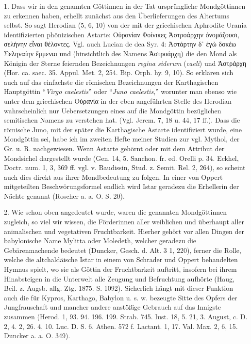 \documentclass[a4paper, 11pt, oneside]{article}
\begin{document}
1. Dass wir in den genannten Göttinnen in der Tat ursprüngliche Mondgöttinnen zu erkennen haben, erhellt zunächst aus den Überlieferungen des Altertums selbst. So sagt Herodian (5, 6, 10) von der mit der griechischen Aphrodite Urania identifizierten phönizischen Astarte: Οὐρανίαν Φοίνικες Ἀστροάρχην ὀνομάζουσι, σελήνην εἶναι θέλοντες. Vgl. auch Lucian de dea Syr. 4: Ἀστάρτην δ᾽ ἐγὼ δοκέω Σεληναίην ἔμμεναι und (hinsichtlich des Namens Ἀστροάρχη) die den Mond als Königin der Sterne feiernden Bezeichnungen \emph{regina siderum} (\emph{caeli}) und Ἀστράρχη (Hor. ca. saec. 35. Appul. Met. 2, 254. Bip. Orph. hy. 9, 10). So erklären sich auch auf das einfachste die römischen Bezeichnungen der Karthagischen Hauptgöttin "`\emph{Virgo caelestis}"' oder "`\emph{Juno caelestis},"' worunter man ebenso wie unter dem griechischen Οὐρανία in der eben angeführten Stelle des Herodian wahrscheinlich nur Uebersetzungen eines auf die Mondgöttin bezüglichen semitischen Namens zu verstehen hat. (Vgl. Jerem. 7, 18 u. 44, 17 ff.). Dass die römische Juno, mit der später die Karthagische Astarte identifiziert wurde, eine Mondgöttin sei, habe ich im zweiten Hefte meiner Studien zur vgl. Mythol, der Gr. u. R. nachgewiesen. Wenn Astarte gehörnt oder mit dem Attribut der Mondsichel dargestellt wurde (Gen. 14, 5. Sanchon. fr. ed. Orelli p. 34. Eckhel, Doctr. num. 1, 3, 369 ff. vgl. v. Baudissin, Stud. z. Semit. Rel. 2, 264), so scheint auch dies direkt aus ihrer Mondbedeutung zu folgen. In einer von Oppert mitgeteilten Beschwörungsformel endlich wird Istar geradezu die Erhellerin der Nächte genannt (Roscher a. a. O. S. 20).

2. Wie schon oben angedeutet wurde, waren die genannten Mondgöttinnen zugleich, so viel wir wissen, die Förderinnen aller weiblichen und überhaupt aller animalischen und vegetativen Fruchtbarkeit. Hierher gehört vor allen Dingen der babylonische Name Mylitta oder Moledeth, welcher geradezu die Gebärenmachende bedeutet (Duncker, Gesch. d. Alt. 3 1, 220), ferner die Rolle, welche die altchaldäische Istar in einem von Schrader und Oppert behandelten Hymnus spielt, wo sie als Göttin der Fruchtbarkeit auftritt, insofern bei ihrem Hinabsteigen in die Unterwelt alle Zeugung und Befruchtung aufhörte (Haug, Beil. z. Augsb. allg. Ztg. 1875. S. 1092). Sicherlich hängt mit dieser Funktion auch die für Kypros, Karthago, Babylon u. s. w. bezeugte Sitte des Opfers der Jungfrauschaft und mancher andere anstößige Gebrauch auf das Innigste zusammen (Herod. 1, 93. 94. 196. 199. Strab. 745. Iust. 18, 5. 21, 3. August, c. D. 2, 4. 2, 26. 4, 10. Luc. D. S. 6. Athen. 572 f. Lactant. 1, 17. Val. Max. 2, 6, 15. Duncker a. a. O. 349).
\end{document}
